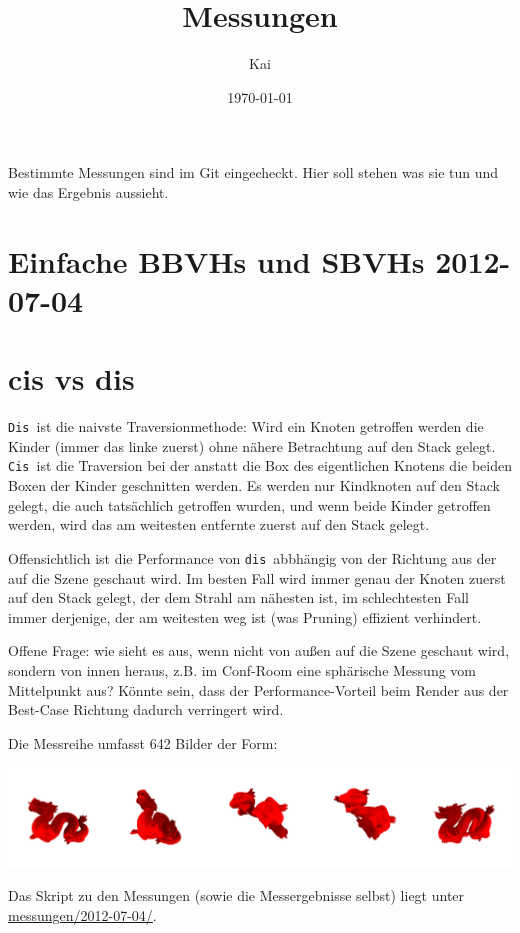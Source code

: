 \documentclass[a4paper,11pt]{article}
\title{Messungen}
\author{Kai}
\date{\today}
\begin{document}
\maketitle\thispagestyle{empty}
Bestimmte Messungen sind im Git eingecheckt. Hier soll stehen was sie tun und wie das Ergebnis aussieht.

\section{Einfache BBVHs und SBVHs \hfill 2012-07-04}

\section{cis vs dis}
\newcommand\Cis{\texttt{Cis}\ }
\newcommand\Dis{\texttt{Dis}\ }
\newcommand\cis{\texttt{cis}\ }
\newcommand\dis{\texttt{dis}\ }
\newcommand\newword[1]{\marginpar{#1}}
\newcommand\frage{\marginpar{\tt \Large ?}}
\newcommand\todo{\marginpar{\tt \Large Todo!}}

\newword\dis
\Dis ist die naivste Traversionmethode: 
	Wird ein Knoten getroffen werden die Kinder (immer das linke zuerst) ohne nähere Betrachtung auf den Stack gelegt.
\newword\cis
\Cis ist die Traversion bei der anstatt die Box des eigentlichen Knotens die beiden Boxen der Kinder geschnitten werden. 
	Es werden nur Kindknoten auf den Stack gelegt, die auch tatsächlich getroffen wurden, und wenn beide Kinder
	getroffen werden, wird das am weitesten entfernte zuerst auf den Stack gelegt.

Offensichtlich ist die Performance von \dis abbhängig von der Richtung aus der auf die Szene geschaut wird.
Im besten Fall wird immer genau der Knoten zuerst auf den Stack gelegt, der dem Strahl am nähesten ist, 
	im schlechtesten Fall immer derjenige, der am weitesten weg ist (was Pruning) effizient verhindert.

Offene Frage: \frage wie sieht es aus, wenn nicht von außen auf die Szene geschaut wird, sondern von innen heraus, z.B. im Conf-Room eine
	sphärische Messung vom Mittelpunkt aus?
Könnte sein, dass der Performance-Vorteil beim Render aus der Best-Case Richtung dadurch verringert wird.

Die Messreihe umfasst 642 Bilder der Form:
\begin{center}
\includegraphics[width=\textwidth]{messreihe-bsp.png}
\end{center}

Das Skript zu den Messungen (sowie die Messergebnisse selbst) liegt unter \todo \url{messungen/2012-07-04/}.
\end{document}
